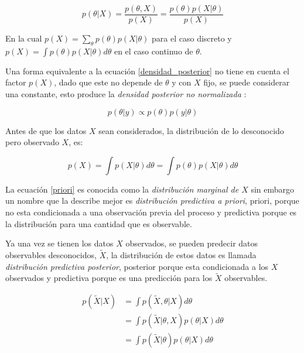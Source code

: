 \begin{center}
\begin{equation}
p(\theta|X)=\frac{p(\theta,X)}{p(X)}=\frac{p(\theta)p(X|\theta)}{p(X)}
\label{densidad_posterior}
\end{equation}
\end{center}

En la cual $p(X)=\sum_{\theta}p(\theta)p(X|\theta)$ para el caso discreto y $p(X)=\int p(\theta)p(X|\theta)d\theta $ en el caso continuo de $\theta$. 

Una forma equivalente a la ecuación \ref{densidad_posterior} no tiene en cuenta el factor $p(X)$, dado que este no depende de $\theta$ y con $X$ fijo, se puede considerar una constante, esto produce la \textit{densidad posterior no normalizada} \cite{infe_bayes}: 

\begin{equation}
p(\theta|y)\propto p(\theta)p(y|\theta)
\label{densidad_posterior_no_norm}
\end{equation}

Antes de que los datos $X$ sean considerados, la distribución de lo desconocido pero observado $X$, es: 

\begin{equation}
p(X)=\int p(X|\theta)d\theta=\int p(\theta)p(X|\theta)d\theta
\label{priori}
\end{equation}

La ecuación \ref{priori} es conocida como la \textit{distribución marginal de $X$} sin embargo un nombre que la describe mejor es \textit{distribución predictiva a priori}, priori, porque no esta condicionada a una observación previa del proceso y predictiva porque es la distribución para una cantidad que es observable. 

Ya una vez se tienen los datos $X$ observados, se pueden predecir datos observables desconocidos, $ \widetilde{X}$, la distribución de estos datos es llamada \textit{distribución predictiva posterior}, posterior porque esta condicionada a los $X$ observados y predictiva porque es una predicción para los $ \widetilde{X}$ observables. 

\begin{equation} \label{posterior}
\begin{split}
p(\widetilde{X}|X) & = \int p(\widetilde{X},\theta|X)d\theta \\
 & = \int p(\widetilde{X}|\theta,X)p(\theta|X)d\theta\\
 & = \int p(\widetilde{X}|\theta)p(\theta|X)d\theta
\end{split}
\end{equation}

